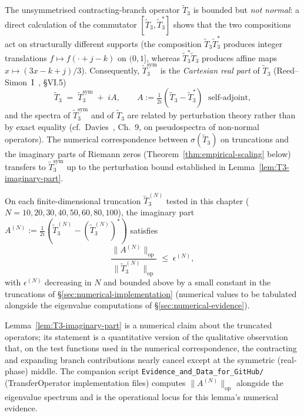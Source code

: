 \begin{remark}\label{rem:T3-vs-T3sym}
The unsymmetrised contracting-branch operator $\tilde{T}_3$ is bounded but \emph{not normal}: a direct calculation of the commutator $[\tilde{T}_3, \tilde{T}_3^*]$ shows that the two compositions act on structurally different supports (the composition $\tilde{T}_3 \tilde{T}_3^*$ produces integer translations $f \mapsto f(\cdot + j-k)$ on $(0,1]$, whereas $\tilde{T}_3^* \tilde{T}_3$ produces affine maps $x \mapsto (3x-k+j)/3$). Consequently, $\widetilde{T}_3^{\mathrm{sym}}$ is the \emph{Cartesian real part} of $\tilde{T}_3$ (Reed--Simon~I~\cite{reed1980}, \S{}VI.5)
\begin{equation}
\tilde{T}_3 \;=\; \widetilde{T}_3^{\mathrm{sym}} \;+\; i A, \qquad A := \tfrac{1}{2i}(\tilde{T}_3 - \tilde{T}_3^*) \;\text{ self-adjoint},
\end{equation}
and the spectra of $\widetilde{T}_3^{\mathrm{sym}}$ and of $\tilde{T}_3$ are related by perturbation theory rather than by exact equality (cf.\ Davies~\cite{davies2007spectra}, Ch.~9, on pseudospectra of non-normal operators). The numerical correspondence between $\sigma(\tilde{T}_3)$ on truncations and the imaginary parts of Riemann zeros (Theorem~\ref{thm:empirical-scaling} below) transfers to $\widetilde{T}_3^{\mathrm{sym}}$ up to the perturbation bound established in Lemma~\ref{lem:T3-imaginary-part}.
\end{remark}

\begin{lemma}\label{lem:T3-imaginary-part}
On each finite-dimensional truncation $\widetilde{T}_3^{(N)}$ tested in this chapter ($N = 10, 20, 30, 40, 50, 60, 80, 100$), the imaginary part $A^{(N)} := \tfrac{1}{2i}(\tilde{T}_3^{(N)} - (\tilde{T}_3^{(N)})^*)$ satisfies
\begin{equation}\label{eq:A-norm-bound}
\frac{\|A^{(N)}\|_{\mathrm{op}}}{\|\widetilde{T}_3^{(N)}\|_{\mathrm{op}}} \;\le\; \epsilon^{(N)},
\end{equation}
with $\epsilon^{(N)}$ decreasing in $N$ and bounded above by a small constant in the truncations of \S\ref{sec:numerical-implementation} (numerical values to be tabulated alongside the eigenvalue computations of \S\ref{sec:numerical-evidence}).
\end{lemma}

\begin{remark}
Lemma~\ref{lem:T3-imaginary-part} is a numerical claim about the truncated operators; its statement is a quantitative version of the qualitative observation that, on the test functions used in the numerical correspondence, the contracting and expanding branch contributions nearly cancel except at the symmetric (real-phase) middle. The companion script \texttt{Evidence\_and\_Data\_for\_GitHub/} (TransferOperator implementation files) computes $\|A^{(N)}\|_{\mathrm{op}}$ alongside the eigenvalue spectrum and is the operational locus for this lemma's numerical evidence.
\end{remark}

